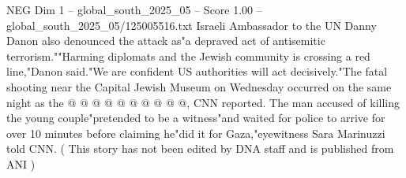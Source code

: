 \begin{textsample}{NEG Dim 1 – global\_south\_2025\_05 – Score 1.00 – global\_south\_2025\_05/125005516.txt}
Israeli Ambassador to the UN Danny Danon also denounced the attack as"a depraved act of antisemitic terrorism.""Harming diplomats and the Jewish community is crossing a red line,"Danon said."We are confident US authorities will act decisively."The fatal shooting near the Capital Jewish Museum on Wednesday occurred on the same night as the @ @ @ @ @ @ @ @ @ @, CNN reported.
The man accused of killing the young couple"pretended to be a witness"and waited for police to arrive for over 10 minutes before claiming he"did it for Gaza,"eyewitness Sara Marinuzzi told CNN. ( This story has not been edited by DNA staff and is published from ANI )

\end{textsample}
